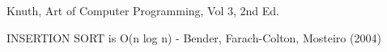 \documentclass[11pt]{article}
\begin{document}
\begin{thebibliography}{99}

 Knuth, Art of Computer Programming, Vol 3, 2nd Ed.

 INSERTION SORT is O(n log n) -  Bender, Farach-Colton, Mosteiro (2004)   
\hfil{}

\end{thebibliography}
\end{document}
